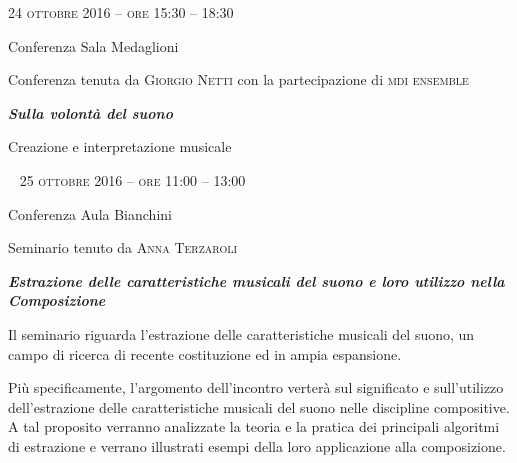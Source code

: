 
\begin{flushright}

\large{
	\scshape{
	24 ottobre 2016 -- ore 15:30 -- 18:30
	}}

\medskip
	
\small{Conferenza
	\newline Sala Medaglioni}

\medskip

{\fontsize{42}{42} }

\normalfont

\normalsize

\bigskip

Conferenza tenuta da \textsc{Giorgio Netti} con la partecipazione di \textsc{mdi ensemble}

\bigskip

\textbf{\emph{Sulla volontà del suono}}

Creazione e interpretazione musicale


%
%

~\vfill
\large{
	\scshape{
	25 ottobre 2016 -- ore 11:00 -- 13:00
	}}

\medskip
	
\small{Conferenza
	\newline Aula Bianchini}

\medskip

{\fontsize{42}{42} }

\normalfont

\normalsize

\bigskip

Seminario tenuto da \textsc{Anna Terzaroli}

\bigskip

\textbf{\emph{Estrazione delle caratteristiche musicali del suono e loro utilizzo nella Composizione}}

Il seminario riguarda l'estrazione delle caratteristiche musicali del suono, un campo di ricerca di recente costituzione ed in ampia espansione. 

Più specificamente, l'argomento dell'incontro verterà sul significato e sull'utilizzo dell'estrazione delle caratteristiche musicali del suono nelle discipline compositive. A tal proposito verranno analizzate la teoria e la pratica dei principali algoritmi di estrazione e verrano illustrati esempi della loro applicazione alla composizione.

\end{flushright}

\vfill